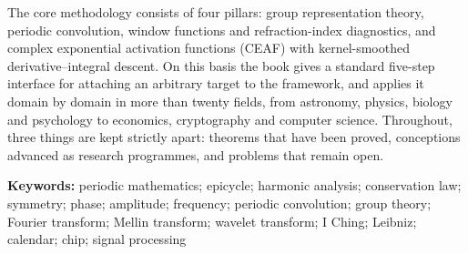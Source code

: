 The core methodology consists of four pillars: group representation theory, periodic convolution, window functions and refraction-index diagnostics, and complex exponential activation functions (CEAF) with kernel-smoothed derivative--integral descent. On this basis the book gives a standard five-step interface for attaching an arbitrary target to the framework, and applies it domain by domain in more than twenty fields, from astronomy, physics, biology and psychology to economics, cryptography and computer science. Throughout, three things are kept strictly apart: theorems that have been proved, conceptions advanced as research programmes, and problems that remain open.

\vspace{1em}
\noindent\textbf{Keywords:} periodic mathematics; epicycle; harmonic analysis; conservation law; symmetry; phase; amplitude; frequency; periodic convolution; group theory; Fourier transform; Mellin transform; wavelet transform; I Ching; Leibniz; calendar; chip; signal processing

\newpage

